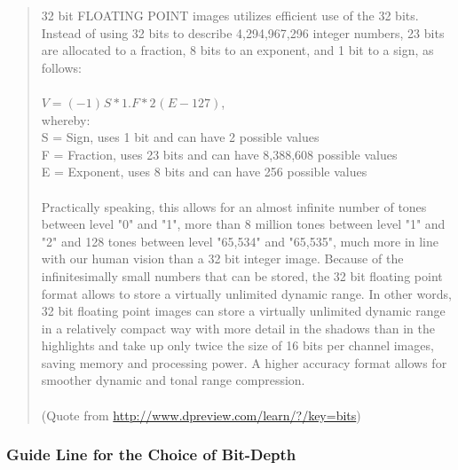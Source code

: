 \begin{quotation}
32 bit FLOATING POINT images utilizes efficient use of the 32 bits.
Instead of using 32 bits to describe 4,294,967,296 integer numbers, 23
bits are allocated to a fraction, 8 bits to an exponent, and 1 bit to a
sign, as follows:\\
~\\
$V = (-1)^{}S * 1.F * 2^{}(E-127)$,\\ 
whereby:\\
S = Sign, uses 1 bit and can have 2 possible values\\
F = Fraction, uses 23 bits and can have 8,388,608 possible
values\\
E = Exponent, uses 8 bits and can have 256 possible values\\
~\\
Practically speaking, this allows for an almost infinite number of tones
between level "0" and
"1", more than 8 million tones between
level "1" and
"2" and 128 tones between level
"65,534" and
"65,535", much more in line with our human
vision than a 32 bit integer image. Because of the infinitesimally
small numbers that can be stored, the 32 bit floating point format
allows to store a virtually unlimited dynamic range. In other words, 32
bit floating point images can store a virtually unlimited dynamic range
in a relatively compact way with more detail in the shadows than in the
highlights and take up only twice the size of 16 bits per channel
images, saving memory and processing power. A higher accuracy format
allows for smoother dynamic and tonal range compression.\\
\\
(Quote from \url{http://www.dpreview.com/learn/?/key=bits})
\end{quotation}

\subsubsection{Guide Line for the Choice of Bit-Depth}

